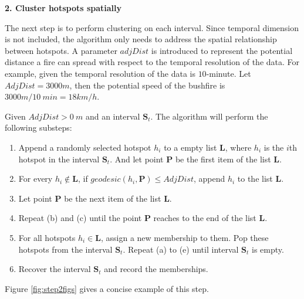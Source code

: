\textbf{2. Cluster hotspots spatially}

The next step is to perform clustering on each interval. Since temporal
dimension is not included, the algorithm only needs to address the
spatial relationship between hotspots. A parameter \(adjDist\) is
introduced to represent the potential distance a fire can spread with
respect to the temporal resolution of the data. For example, given the
temporal resolution of the data is \(10\)-minute. Let
\(AdjDist = 3000 m\), then the potential speed of the bushfire is
\(3000m/10~min = 18km/h\).

Given \(AdjDist>0~m\) and an interval \(\boldsymbol{S}_t\). The
algorithm will perform the following substeps:

\begin{enumerate}
\def\labelenumi{(\alph{enumi})}
\item
  Append a randomly selected hotspot \(h_i\) to a empty list
  \(\boldsymbol{L}\), where \(h_i\) is the \(i\)th hotspot in the
  interval \(\boldsymbol{S}_t\). And let point \(\boldsymbol{P}\) be the
  first item of the list \(\boldsymbol{L}\).
\item
  For every \(h_i \notin \boldsymbol{L}\), if
  \(geodesic(h_i, \boldsymbol{P})\leq AdjDist\), append \(h_i\) to the
  list \(\boldsymbol{L}\).
\item
  Let point \(\boldsymbol{P}\) be the next item of the list
  \(\boldsymbol{L}\).
\item
  Repeat (b) and (c) until the point \(\boldsymbol{P}\) reaches to the
  end of the list \(\boldsymbol{L}\).
\item
  For all hotspots \(h_i \in \boldsymbol{L}\), assign a new membership
  to them. Pop these hotspots from the interval \(\boldsymbol{S}_t\).
  Repeat (a) to (e) until interval \(\boldsymbol{S}_t\) is empty.
\item
  Recover the interval \(\boldsymbol{S}_t\) and record the memberships.
\end{enumerate}

Figure \ref{fig:step2figs} gives a concise example of this step.


